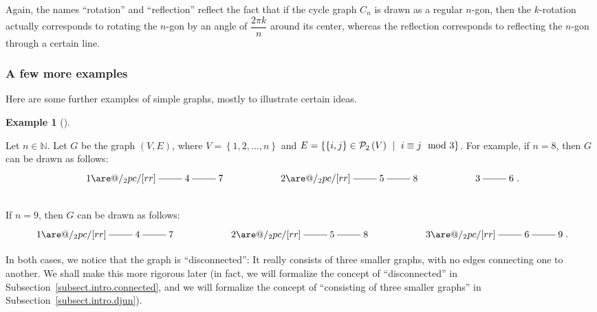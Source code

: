 \documentclass[numbers=enddot,12pt,final,onecolumn,notitlepage]{scrartcl}%
\makeatletter
\theoremstyle{definition}
\newtheorem{exam}[theo]{Example}
\newenvironment{example}[1][]
{\begin{exam}[#1]\begin{leftbar}}
{\end{leftbar}\end{exam}}
\newcommand{\NN}{\mathbb{N}}
\newcommand{\powset}[2][]{\ifthenelse{\equal{#2}{}}{\mathcal{P}\left(#1\right)}{\mathcal{P}_{#1}\left(#2\right)}}
\newcommand{\set}[1]{\left\{ #1 \right\}}
\newcommand{\tup}[1]{\left( #1 \right)}
\newcommand{\are}{\ar@{-}}
\makeatother
\begin{document}
Again, the names ``rotation'' and ``reflection'' reflect the
fact that if the cycle graph $C_n$ is drawn as a regular $n$-gon,
then the $k$-rotation actually corresponds to rotating the $n$-gon
by an angle of $\dfrac{2\pi k}{n}$ around its center, whereas the
reflection corresponds to reflecting the $n$-gon through a certain
line.

\subsubsection{A few more examples}

Here are some further examples of simple graphs, mostly to illustrate
certain ideas.

\Needspace{8pc}
\begin{example} \label{exa.intro.discon-graph}
Let $n \in \NN$. Let $G$ be the graph $\tup{V, E}$, where
$V = \set{1, 2, \ldots, n}$ and
$E = \set{ \set{i, j} \in \powset[2]{V} \ \mid
           \  i \equiv j \mod 3 }$.
For example, if $n = 8$, then $G$ can be drawn as follows:
\begin{align*}
\xymatrix{
1 \are@/_2pc/[rr] \are[r] & 4 \are[r] & 7
& &
2 \are@/_2pc/[rr] \are[r] & 5 \are[r] & 8
& &
3 \are[r] & 6
} . \\
\phantom{a} %
\end{align*}
If $n = 9$, then $G$ can be drawn as follows:
\begin{align*}
\xymatrix{
1 \are@/_2pc/[rr] \are[r] & 4 \are[r] & 7
& &
2 \are@/_2pc/[rr] \are[r] & 5 \are[r] & 8
& &
3 \are@/_2pc/[rr] \are[r] & 6 \are[r] & 9
} .
\end{align*}
\phantom{a} %
\par
In both cases, we notice that the graph is ``disconnected'': It
really consists of three smaller graphs, with no edges connecting one
to another. We shall make this more rigorous later (in fact, we will
formalize the concept of ``disconnected'' in
Subsection~\ref{subsect.intro.connected}, and we will formalize the
concept of ``consisting of three smaller graphs'' in
Subsection~\ref{subsect.intro.djun}).
\end{example}
\end{document}
